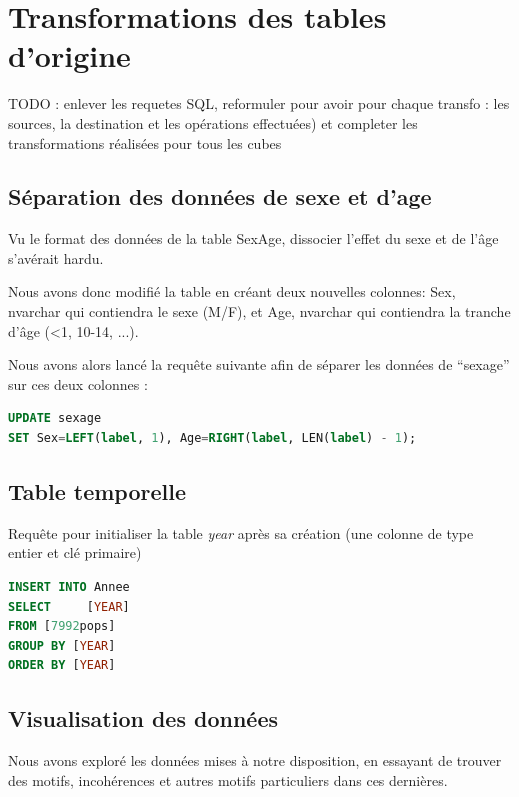 \pagebreak


\chapter{Transformations des tables d'origine}

TODO : enlever les requetes SQL, reformuler pour avoir pour chaque transfo : les sources, la destination et les opérations effectuées) et completer les transformations réalisées pour tous les cubes

\section{Séparation des données de sexe et d'age}

    Vu le format des données de la table SexAge, dissocier l'effet du sexe et de l'âge s'avérait hardu.

    Nous avons donc modifié la table en créant deux nouvelles colonnes: Sex, nvarchar qui contiendra le sexe (M/F), et Age,
    nvarchar qui contiendra la tranche d'âge (<1, 10-14, ...).

    Nous avons alors lancé la requête suivante afin de séparer les données de ``sexage'' sur ces deux colonnes :

    \begin{lstlisting}[frame=single, language=SQL]
UPDATE sexage
SET Sex=LEFT(label, 1), Age=RIGHT(label, LEN(label) - 1);
    \end{lstlisting}

\section{Table temporelle}

    Requête pour initialiser la table \textit{year} après sa création (une colonne de type entier et clé primaire)

    \begin{lstlisting}[frame=single, language=SQL]
INSERT INTO Annee
SELECT     [YEAR]
FROM [7992pops]
GROUP BY [YEAR]
ORDER BY [YEAR]
    \end{lstlisting}

\section{Visualisation des données}

    Nous avons exploré les données mises à notre disposition, en essayant de trouver des motifs, incohérences et autres motifs particuliers
    dans ces dernières.


